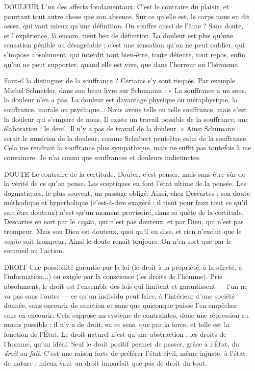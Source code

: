 DOULEUR L'un des affects fondamentaux. C’est le contraire du plaisir, et
pourtant tout autre chose que son absence. Sur ce qu’elle est, le
corps nous en dit assez, qui vaut mieux qu’une définition. On souffre aussi de
l’âme ? Sans doute, et l’expérience, là encore, tient lieu de définition. La douleur
est plus qu’une sensation pénible ou désagréable ; c’est une sensation
qu’on ne peut oublier, qui s'impose absolument, qui interdit tout bien-être,
toute détente, tout repos, enfin qu’on ne peut supporter, quand elle est vive,
que dans l’horreur ou l’héroïsme.

Faut-il la distinguer de la souffrance ? Certains s’y sont risqués. Par exemple
Michel Schneider, dans son beau livre sur Schumann : « La souffrance a un
sens, la douleur n’en a pas. La douleur est davantage physique ou métaphysique,
la souffrance, morale ou psychique... Nous avons telle ou telle souffrance,
mais c’est la douleur qui s'empare de nous. Il existe un travail possible
de la souffrance, une élaboration : le deuil. Il n’y a pas de travail de la douleur. »
Ainsi Schumann serait le musicien de la douleur, comme Schubert peut-être
celui de la souffrance. Cela me rendrait la souffrance plus sympathique, mais
ne suffit pas toutefois à me convaincre. Je n’ai connu que souffrances et douleurs
indistinctes.

DOUTE Le contraire de la certitude. Douter, c’est penser, mais sans être
sûr de la vérité de ce qu’on pense. Les sceptiques en font l’état
ultime de la pensée. Les dogmatiques, le plus souvent, un passage obligé. Ainsi,
chez Descartes : son doute méthodique et hyperbolique (c’est-à-dire exagéré : il
tient pour faux tout ce qu’il sait être douteux) n’est qu’un moment provisoire,
dans sa quête de la certitude. Descartes en sort par le {\it cogito}, qui n’est pas douteux,
et par Dieu, qui n’est pas trompeur. Mais son Dieu est douteux, quoi
qu'il en dise, et rien n’exclut que le {\it cogito} soit trompeur. Ainsi le doute renaît
toujours. On n’en sort que par le sommeil ou l’action.

DROIT Une possibilité garantie par la loi (le droit à la propriété, à la sûreté,
à l'information...) ou exigée par la conscience (les droits de
l’homme). Pris absolument, le droit est l’ensemble des lois qui limitent et
garantissent — l’un ne va pas sans l’autre — ce qu’un individu peut faire, à l’intérieur
d’une société donnée, sans encourir de sanction et sans que quiconque
puisse l’en empêcher sans en encourir. Cela suppose un système de contraintes,
donc une répression au moins possible : il n’y a de droit, en ce sens, que par la
force, et telle est la fonction de l’État. Le droit naturel n’est qu’une abstraction ;
les droits de l’homme, qu’un idéal. Seul le droit positif permet de passer, grâce
à l’État, du {\it droit} au {\it fait}. C’est une raison forte de préférer l’état civil, même
injuste, à l’état de nature : mieux vaut un droit imparfait que pas de droit du
tout.

